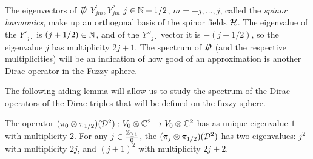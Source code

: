 The eigenvectors of $\slashed D$ $Y^{'}_{jm}, Y^{''}_{jm}$ $j \in \mathbb{N} + 1/2$, $m = -j, \dots, j$, called the \textit{spinor harmonics}, make up an orthogonal basis of the spinor fields $\mathcal H$. The eigenvalue of the $Y'_{j\cdot}$ is $(j + 1/2) \in \mathbb{N}$, and of the $Y{''}_{j\cdot}$ vector it is $-(j + 1/2)$, so the eigenvalue $j$ has multiplicity $2j+1$. The spectrum of $\slashed D$ (and the respective multiplicities) will be an indication of how good of an approximation is another Dirac operator in the Fuzzy sphere. 

The following aiding lemma \cite{DAndrea2013} will allow us to study the spectrum of the Dirac operators of the Dirac triples that will be defined on the fuzzy sphere.

\begin{lemma}\label{lemmaSpectrumAlgebraic}
The operator $(\pi_0 \otimes \pi_{1/2})(\mathcal D^2): V_0 \otimes \mathbb{C}^2 \to V_0 \otimes \mathbb{C}^2$ has as unique eigenvalue $1$ with multiplicity $2$. For any $j \in \frac{\mathbb{Z}_{\geq 1}}{0}$, the $(\pi_j \otimes \pi_{1/2})(\mathcal D^2)$ has two eigenvalues: $j^2$ with multiplicity $2j$, and $(j+1)^2$ with multiplicity $2j+2$.
\end{lemma}






